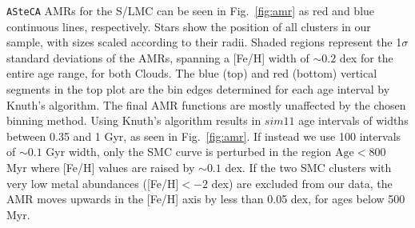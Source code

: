 \documentclass[referee]{aa}
\begin{document}
\texttt{ASteCA} AMRs for the S/LMC can be seen in Fig.~\ref{fig:amr} as red and
blue continuous lines, respectively. Stars show the position of all clusters in
our sample, with sizes scaled according to their radii.
%
Shaded regions represent the 1$\sigma$ standard deviations of the AMRs, spanning
a [Fe/H] width of ${\sim}0.2$ dex for the entire age range, for both Clouds.
The blue (top) and red (bottom) vertical segments in the top plot are the bin
edges determined for each age interval by Knuth's algorithm.
%
The final AMR functions are mostly unaffected by the chosen binning method.
Using Knuth's algorithm results in ${sim}11$ age intervals of widths between
0.35 and 1 Gyr, as seen in Fig.~\ref{fig:amr}. If instead we use 100 intervals
of ${\sim}0.1$ Gyr width, only the SMC curve is perturbed in the region
$\mathrm{Age}{<800}$ Myr where [Fe/H] values are raised by ${\sim}0.1$ dex.
%
%
If the two SMC clusters with very low metal abundances ([Fe/H]${<-}2$ dex) are
excluded from our data, the AMR moves upwards in the [Fe/H] axis by less than
0.05 dex, for ages below 500 Myr.
\end{document}

